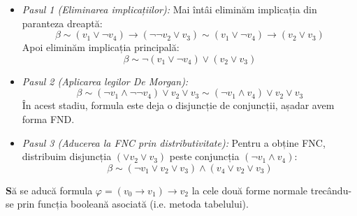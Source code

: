 \begin{solutie}
\begin{itemize}
    \item \textit{Pasul 1 (Eliminarea implicațiilor):}
          Mai întâi eliminăm implicația din paranteza dreaptă:
          \[ \beta \sim (v_1 \lor \neg v_4) \rightarrow (\neg\neg v_2 \lor v_3) \sim (v_1 \lor \neg v_4) \rightarrow (v_2 \lor v_3) \]
          Apoi eliminăm implicația principală:
          \[ \beta \sim \neg (v_1 \lor \neg v_4) \lor (v_2 \lor v_3) \]
    \item \textit{Pasul 2 (Aplicarea legilor De Morgan):}
          \[ \beta \sim (\neg v_1 \land \neg\neg v_4) \lor v_2 \lor v_3 \sim (\neg v_1 \land v_4) \lor v_2 \lor v_3 \]
          În acest stadiu, formula este deja o disjuncție de conjuncții, așadar avem forma FND.
    \item \textit{Pasul 3 (Aducerea la FNC prin distributivitate):}
          Pentru a obține FNC, distribuim disjuncția $(\lor v_2 \lor v_3)$ peste conjuncția $(\neg v_1 \land v_4)$:
          \[ \beta \sim (\neg v_1 \lor v_2 \lor v_3) \land (v_4 \lor v_2 \lor v_3) \]
\end{itemize}


\end{solutie}


\begin{ex}
\textbf Să se aducă formula $\varphi = (v_0 \rightarrow v_1) \rightarrow v_2$ la cele două forme normale trecându-se prin funcția booleană asociată (i.e. metoda tabelului).
\end{ex}

